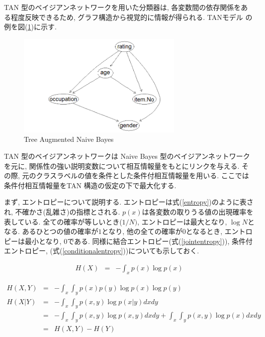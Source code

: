 \documentclass[a4paper]{jarticle}
\begin{document}
TAN 型のベイジアンネットワークを用いた分類器は, 各変数間の依存関係をある程度反映できるため, グラフ構造から視覚的に情報が得られる. TANモデル の例を図(\ref{TAN})に示す.

\begin{figure}[H]
 \begin{center}
  \includegraphics[width=80mm]{data/sample2.png}
 \end{center}
 \caption{Tree Augmented Naive Bayes}
 \label{TAN}
\end{figure}


TAN 型のベイジアンネットワークは Naive Bayes 型のベイジアンネットワークを元に, 関係性の強い説明変数について相互情報量をもとにリンクを与える. その際, 元のクラスラベルの値を条件とした条件付相互情報量を用いる. ここでは条件付相互情報量をTAN 構造の仮定の下で最大化する.

まず, エントロピーについて説明する. エントロピーは式(\ref{entropy})のように表され, 不確かさ(乱雑さ)の指標とされる. $p(x)$は各変数の取りうる値の出現確率を表している. 全ての確率が等しいとき($1/N)$, エントロピーは最大となり, $\log N$となる. あるひとつの値の確率が$1$となり, 他の全ての確率が$0$となるとき, エントロピーは最小となり, $0$である. 同様に結合エントロピー(式(\ref{jointentropy})), 条件付エントロピー, (式(\ref{conditionalentropy}))についても示しておく.

\begin{eqnarray}
\label{entropy}
H(X) &=& - \int_x p(x) \log p(x) 
\end{eqnarray}

\begin{eqnarray}
\label{jointentropy}
H(X, Y) &=& - \int_x \int_y p(x) p(y) \log p(x) \log p(y) \\
\label{conditionalentropy}
H(X| Y) &=& - \int_x \int_y p(x, y) \log p(x| y) dx dy \nonumber \\
           &=& - \int_x \int_y p(x, y) \log p(x, y) dx dy + \int_x \int_y p(x, y) \log p(x) dx dy \nonumber \\
           &=& H(X, Y) - H(Y)
\end{eqnarray}
\end{document}
